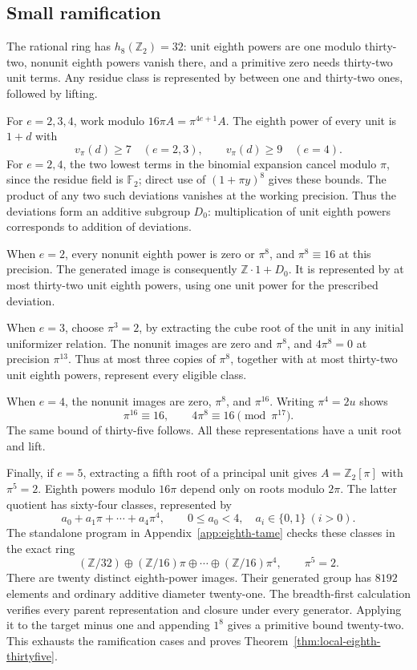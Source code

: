 \documentclass[11pt,reqno]{amsart}
\numberwithin{equation}{section}
\theoremstyle{definition}
\begin{document}
\subsection{Small ramification}

The rational ring has $h_8(\mathbb Z_2)=32$: unit eighth powers are
one modulo thirty-two, nonunit eighth powers vanish there, and a
primitive zero needs thirty-two unit terms. Any residue class is
represented by between one and thirty-two ones, followed by lifting.

For $e=2,3,4$, work modulo $16\pi A=\pi^{4e+1}A$.
The eighth power of every unit is $1+d$ with
\[
 v_\pi(d)\ge7\quad(e=2,3),\qquad
 v_\pi(d)\ge9\quad(e=4).
\]
For $e=2,4$, the two lowest terms in the binomial expansion cancel
modulo $\pi$, since the residue field is $\mathbb F_2$; direct use
of $(1+\pi y)^8$ gives these bounds. The product of any two such
deviations vanishes at the working precision. Thus the deviations
form an additive subgroup $D_0$: multiplication of unit eighth powers
corresponds to addition of deviations.

When $e=2$, every nonunit eighth power is zero or $\pi^8$, and
$\pi^8\equiv16$ at this precision. The generated image is consequently
$\mathbb Z\cdot1+D_0$. It is represented by at most thirty-two unit
eighth powers, using one unit power for the prescribed deviation.

When $e=3$, choose $\pi^3=2$, by extracting the cube root of the
unit in any initial uniformizer relation. The nonunit images are
zero and $\pi^8$, and $4\pi^8=0$ at precision $\pi^{13}$.
Thus at most three copies of $\pi^8$, together with at most
thirty-two unit eighth powers, represent every eligible class.

When $e=4$, the nonunit images are zero, $\pi^8$, and $\pi^{16}$.
Writing $\pi^4=2u$ shows
\[
 \pi^{16}\equiv16,\qquad4\pi^8\equiv16\pmod{\pi^{17}}.
\]
The same bound of thirty-five follows. All these representations
have a unit root and lift.

Finally, if $e=5$, extracting a fifth root of a principal unit gives
$A=\mathbb Z_2[\pi]$ with $\pi^5=2$. Eighth powers modulo $16\pi$
depend only on roots modulo $2\pi$. The latter quotient has sixty-four
classes, represented by
\[
 a_0+a_1\pi+\cdots+a_4\pi^4,
 \qquad0\le a_0<4,\quad a_i\in\{0,1\}\ (i>0).
\]
The standalone program in Appendix~\ref{app:eighth-tame} checks these classes in the exact ring
\[
 (\mathbb Z/32)\oplus
 (\mathbb Z/16)\pi\oplus\cdots\oplus(\mathbb Z/16)\pi^4,
 \qquad\pi^5=2.
\]
There are twenty distinct eighth-power images. Their generated group
has $8192$ elements and ordinary additive diameter twenty-one.
The breadth-first calculation verifies every parent representation
and closure under every generator. Applying it to the target minus
one and appending $1^8$ gives a primitive bound twenty-two.
This exhausts the ramification cases and proves
Theorem~\ref{thm:local-eighth-thirtyfive}.
\end{document}
